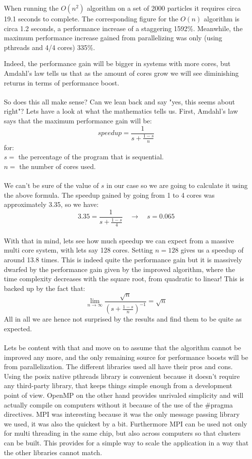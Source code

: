 \documentclass[11pt,a4paper]{article}
\begin{document}
When running the $O(n^{2})$ algorithm on a set of 2000 particles it requires circa 19.1 seconds to complete. The corresponding figure for the $O(n)$ algorithm is circa 1.2 seconds, a performance increase of a staggering 1592\%. Meanwhile, the maximum performance increase gained from parallelizing was only (using pthreads and 4/4 cores) 335\%. 

Indeed, the performance gain will be bigger in systems with more cores, but Amdahl's law tells us that as the amount of cores grow we will see diminishing returns in terms of performance boost.
\\
\\
So does this all make sense? Can we lean back and say "yes, this seems about right"? Lets have a look at what the mathematics tells us. First, Amdahl's law says that the maximum performance gain will be: $$speedup = \frac{1}{s+\frac{1 - s}{n}}$$ for: \\$s =$ the percentage of the program that is sequential. \\ $n =$ the number of cores used. 
\\
\\
We can't be sure of the value of $s$ in our case so we are going to calculate it using the above formula. The speedup gained by going from 1 to 4 cores was approximately 3.35, so we have: $$3.35 = \frac{1}{s+\frac{1 - s}{4}}\quad \rightarrow \quad  s = 0.065$$
\\
With that in mind, lets see how much speedup we can expect from a massive multi core system, with lets say 128 cores. Setting $n = 128$ gives us a speedup of around 13.8 times. This is indeed quite the performance gain but it is massively dwarfed by the performance gain given by the improved algorithm, where the time complexity decreases with the square root, from quadratic to linear! This is backed up by the fact that:
$$\lim_{n \to\infty} \frac{\sqrt{n}}{(s+\frac{1 - s}{n})^{-1}} =\sqrt{n}$$ All in all we are hence not surprised by the results and find them to be quite as expected.
\\
\\
Lets be content with that and move on to assume that the algorithm cannot be improved any more, and the only remaining source for performance boosts will be from parallelization. The different libraries used  all have their pros and cons. Using the posix native pthreads library is convenient because it doesn't require any third-party library, that keeps things simple enough from a development point of view. OpenMP on the other hand provides unrivaled simplicity and will actually compile on computers without it because of the use of the \#pragma directives. MPI was interesting because it was the only message passing library we used, it was also the quickest by a bit. Furthermore MPI can be used not only for multi threading in the same chip, but also across computers so that clusters can be built. This provides for a simple way to scale the application in a way that the other libraries cannot match.
\end{document}
